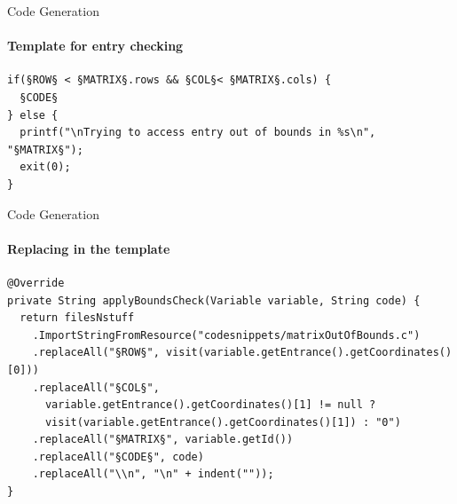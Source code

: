 \begin{frame}[fragile,t]{Code Generation}
\framesubtitle{Template for entry checking}
\begin{lstlisting}[caption=The template for checking if an entry is out of bounds in a matrix.,frame=tlrb, basicstyle=\tiny, numbers=none]
if(§ROW§ < §MATRIX§.rows && §COL§< §MATRIX§.cols) {
  §CODE§
} else {
  printf("\nTrying to access entry out of bounds in %s\n", "§MATRIX§");
  exit(0);
}

\end{lstlisting}

\end{frame}


\begin{frame}[fragile,t]{Code Generation}
\framesubtitle{Replacing in the template}
\begin{lstlisting}[caption=The visit method called generating code for the for loop.,frame=tlrb, basicstyle=\tiny, numbers=none]
@Override
private String applyBoundsCheck(Variable variable, String code) {
  return filesNstuff
    .ImportStringFromResource("codesnippets/matrixOutOfBounds.c")
    .replaceAll("§ROW§", visit(variable.getEntrance().getCoordinates()[0]))
    .replaceAll("§COL§",
      variable.getEntrance().getCoordinates()[1] != null ?
      visit(variable.getEntrance().getCoordinates()[1]) : "0")
    .replaceAll("§MATRIX§", variable.getId())
    .replaceAll("§CODE§", code)
    .replaceAll("\\n", "\n" + indent(""));
}

\end{lstlisting}

\end{frame}







